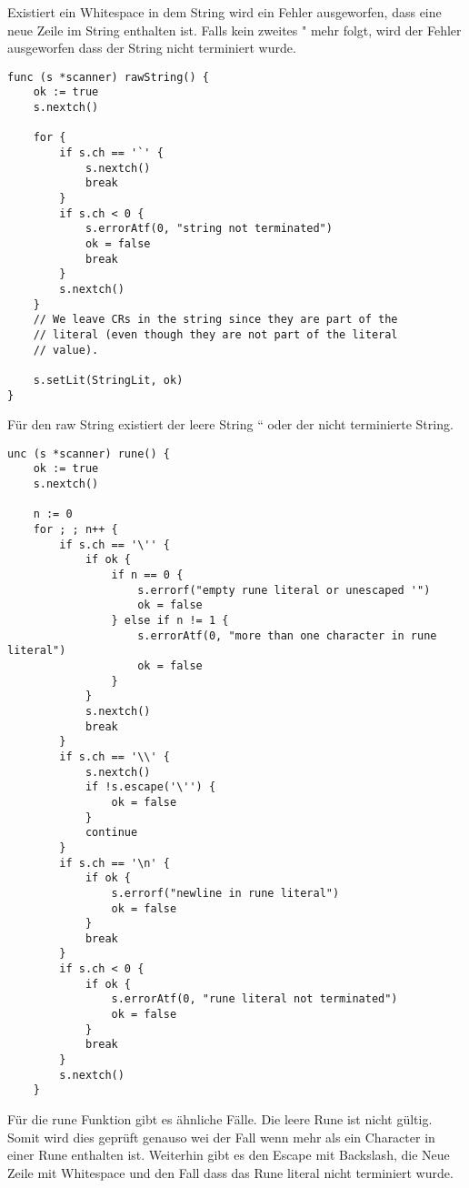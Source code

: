 Existiert ein Whitespace in dem String wird ein Fehler ausgeworfen, dass eine neue Zeile im String enthalten ist. Falls kein zweites " mehr folgt, wird der Fehler ausgeworfen dass der String nicht terminiert wurde.
\begin{lstlisting}
func (s *scanner) rawString() {
	ok := true
	s.nextch()

	for {
		if s.ch == '`' {
			s.nextch()
			break
		}
		if s.ch < 0 {
			s.errorAtf(0, "string not terminated")
			ok = false
			break
		}
		s.nextch()
	}
	// We leave CRs in the string since they are part of the
	// literal (even though they are not part of the literal
	// value).

	s.setLit(StringLit, ok)
}
\end{lstlisting}
Für den raw String existiert der leere String `` oder der nicht terminierte String.
\begin{lstlisting}
unc (s *scanner) rune() {
	ok := true
	s.nextch()

	n := 0
	for ; ; n++ {
		if s.ch == '\'' {
			if ok {
				if n == 0 {
					s.errorf("empty rune literal or unescaped '")
					ok = false
				} else if n != 1 {
					s.errorAtf(0, "more than one character in rune literal")
					ok = false
				}
			}
			s.nextch()
			break
		}
		if s.ch == '\\' {
			s.nextch()
			if !s.escape('\'') {
				ok = false
			}
			continue
		}
		if s.ch == '\n' {
			if ok {
				s.errorf("newline in rune literal")
				ok = false
			}
			break
		}
		if s.ch < 0 {
			if ok {
				s.errorAtf(0, "rune literal not terminated")
				ok = false
			}
			break
		}
		s.nextch()
	}
\end{lstlisting}
Für die rune Funktion gibt es ähnliche Fälle. Die leere Rune ist nicht gültig. Somit wird dies geprüft genauso wei der Fall wenn mehr als ein Character in einer Rune enthalten ist. Weiterhin gibt es den Escape mit Backslash, die Neue Zeile mit Whitespace und den Fall dass das Rune literal nicht terminiert wurde.
